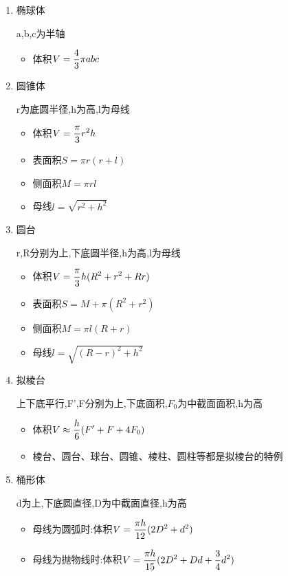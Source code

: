 \begin{enumerate}
	\item 椭球体
	
	a,b,c为半轴
	\begin{itemize}
		\item 体积$\displaystyle V = \frac{4}{3}\pi abc$
	\end{itemize}
	
	\item 圆锥体
	
	r为底圆半径,h为高,l为母线
	\begin{itemize}
		\item 体积$\displaystyle V = \frac{\pi}{3}r^2 h$
		\item 表面积$S = \pi r(r+l)$
		\item 侧面积$M = \pi rl$
		\item 母线$l = \sqrt{r^2 + h^2}$
	\end{itemize}
	
	\item 圆台
	
	r,R分别为上,下底圆半径,h为高,l为母线
	\begin{itemize}
		\item 体积$\displaystyle V = \frac{\pi}{3}h(R^2 + r^2 + Rr)$
		\item 表面积$S = M + \pi (R^2 + r^2)$
		\item 侧面积$M = \pi l(R+r)$
		\item 母线$l = \sqrt{(R - r)^2 + h^2}$
	\end{itemize}
	
	\item 拟棱台
	
	上下底平行,F',F分别为上,下底面积,$F_0$为中截面面积,h为高
	\begin{itemize}
		\item 体积$\displaystyle V \approx \frac{h}{6}(F'+F + 4F_0)$
		\item 棱台、圆台、球台、圆锥、棱柱、圆柱等都是拟棱台的特例
	\end{itemize}
	
	\item 桶形体
	
	d为上,下底圆直径,D为中截面直径,h为高
	\begin{itemize}
		\item 母线为圆弧时:体积$\displaystyle V = \frac{\pi h}{12}(2D^2+d^2)$
		\item 母线为抛物线时:体积$\displaystyle V = \frac{\pi h}{15}(2D^2+Dd + \frac{3}{4}d^2)$
	\end{itemize}
\end{enumerate}
